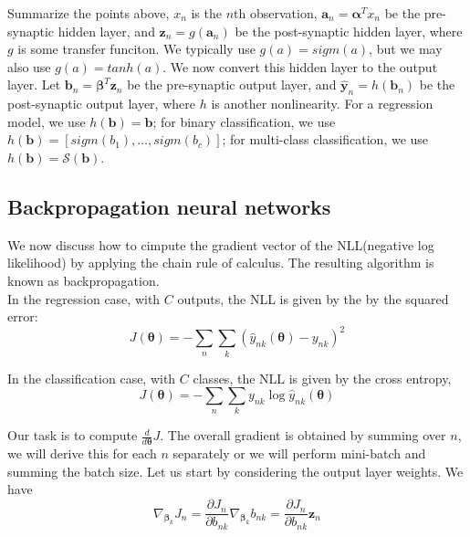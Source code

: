 \documentclass[12pt,a4paper]{article}%
\theoremstyle{definition}
\theoremstyle{plain}
\numberwithin{equation}{section}
\begin{document}
Summarize the points above, $x_{n}$ is the $n$th observation, $\mathbf{a}_{n} = \boldsymbol{\alpha}^{T} x_{n}$ be the pre-synaptic hidden layer, and $\mathbf{z}_{n} = g( \mathbf{a}_{n})$ be the post-synaptic
hidden layer, where $g$ is some transfer funciton. We typically use $g(a)=sigm(a)$, but we may also use $g(a)=tanh(a)$. We now convert this hidden layer to the output layer. Let $\mathbf{b}_{n} = \boldsymbol{\beta}^{T} \mathbf{z}_{n}$ be the pre-synaptic output layer, and $\hat{\mathbf{y}}_{n}=h(\mathbf{b}_{n})$ be the post-synaptic output layer, where $h$ is another nonlinearity. 
For a regression model, we use $h(\mathbf{b})= \mathbf{b}$; for binary classification, we use $h(\mathbf{b})= [sigm(b_{1}),\dots,sigm(b_{c})]$; for multi-class classification, we use $h(\mathbf{b})= \mathcal{S}(\mathbf{b})$.


\subsection{Backpropagation neural networks}
We now discuss how to cimpute the gradient vector of the NLL(negative log likelihood) by applying the chain rule of calculus. The resulting algorithm is known as backpropagation.~\\

In the regression case, with $C$ outputs, the NLL is given by the by the squared error:
\begin{equation}
J(\boldsymbol{\theta}) = -\sum\limits_{n}\sum\limits_{k}(\hat{y}_{nk}(\boldsymbol{\theta})-y_{nk})^{2}
\end{equation}

In the classification case, with $C$ classes, the NLL is given by the cross entropy,
\begin{equation}
J(\boldsymbol{\theta}) = -\sum\limits_{n} \sum\limits_{k} y_{nk} \log \hat{y}_{nk}(\boldsymbol{\theta}) 
\end{equation}

Our task is to compute $\frac{d}{d\boldsymbol{\theta}}J$. The overall gradient is obtained by summing over $n$, we will derive this for each $n$ separately or we will perform mini-batch and summing the batch size.
Let us start by considering the output layer weights. We have
\begin{equation}
\nabla_{\boldsymbol{\beta}_{k}} J_{n} = \frac{\partial J_{n}}{\partial b_{nk}} \nabla_{\boldsymbol{\beta}_{k}} b_{nk} = \frac{\partial J_{n}}{\partial b_{nk}} \mathbf{z}_{n}
\end{equation}
\end{document}
